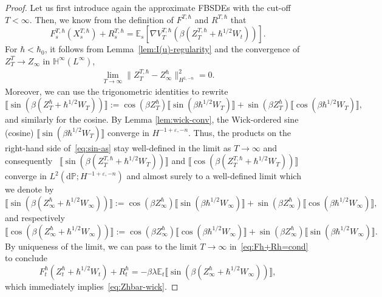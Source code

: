\documentclass[11pt, a4paper]{scrartcl}
\numberwithin{equation}{section}
\theoremstyle{plain}
\theoremstyle{remark}
\newcommand{\assign}{:=}
\newcommand{\mathd}{\mathrm{d}}
\begin{document}
\begin{proof}
  Let us first introduce again the approximate FBSDEs with the cut-off $T <
  \infty$. Then, we know from the definition of $F^{T, \hbar}$ and $R^{T,
  \hbar}$ that
  \begin{equation}
    F^{T, \hbar}_s (X^{T, \hbar}_s) + R^{T, \hbar}_s =\mathbb{E}_s [\nabla
    V^{T, \hbar}_T (\beta (Z_T^{T, \hbar} + \hbar^{1 / 2} W_t))] .
    \label{eq:Fh+Rh=cond}
  \end{equation}
  For $\hbar < \hbar_0$, it follows from Lemma~\ref{lem:I(u)-regularity} and
  the convergence of $Z^T_T \rightarrow Z_{\infty}$ in $\mathbb{H}^{\infty}
  (L^{\infty})$,
  \[ \begin{aligned}
       \lim_{T \rightarrow \infty} \| Z_T^{T, \hbar} - Z^{\hbar}_{\infty}
       \|_{H^{1, - n}}^2 = 0.
     \end{aligned} \]
  Moreover, we can use the trigonometric identities to rewrite
  \begin{equation}
    \llbracket \sin (\beta (Z^{\hbar}_T + \hbar^{1 / 2} W_T)) \rrbracket
    \assign \cos (\beta Z^{\hbar}_T) \llbracket \sin (\beta \hbar^{1 / 2} W_T)
    \rrbracket + \sin (\beta Z^{\hbar}_T) \llbracket \cos (\beta \hbar^{1 / 2}
    W_T) \rrbracket, \label{eq:sin-as}
  \end{equation}
  and similarly for the cosine. By Lemma \ref{lem:wick-conv}, the Wick-ordered
  sine (cosine) $\llbracket \sin (\beta \hbar^{1 / 2} W_T) \rrbracket$
  converge in $H^{- 1 + \varepsilon, - n}$. Thus, the products on the
  right-hand side of~\eqref{eq:sin-as} stay well-defined in the limit as $T
  \rightarrow \infty$ and consequently \ $\llbracket \sin (\beta (Z^{T,
  \hbar}_T + \hbar^{1 / 2} W_T)) \rrbracket$ and $\llbracket \cos (\beta
  (Z^{T, \hbar}_T + \hbar^{1 / 2} W_T)) \rrbracket$ converge in $L^2 (\mathd \mathbb{P}
  ; H^{- 1 + \varepsilon, - n})$ and almost surely to a well-defined limit
  which we denote by
  \begin{equation}
    \llbracket \sin (\beta (Z^{\hbar}_{\infty} + \hbar^{1 / 2} W_{\infty}))
    \rrbracket \assign \cos (\beta Z^{\hbar}_{\infty}) \llbracket \sin (\beta
    \hbar^{1 / 2} W_{\infty}) \rrbracket + \sin (\beta Z^{\hbar}_{\infty})
    \llbracket \cos (\beta \hbar^{1 / 2} W_{\infty}) \rrbracket,
    \label{eq:def-Vinfty}
  \end{equation}
  and respectively
  \[ \llbracket \cos (\beta (Z^{\hbar}_{\infty} + \hbar^{1 / 2} W_{\infty}))
     \rrbracket \assign \cos (\beta Z^{\hbar}_{\infty}) \llbracket \cos (\beta
     \hbar^{1 / 2} W_{\infty}) \rrbracket + \sin (\beta Z^{\hbar}_{\infty})
     \llbracket \sin (\beta \hbar^{1 / 2} W_{\infty}) \rrbracket . \]
  By uniqueness of the limit, we can pass to the limit $T \rightarrow \infty$
  in~\eqref{eq:Fh+Rh=cond} to conclude
  \[ F_t^{\hbar} (Z_t^{\hbar} + \hbar^{1 / 2} W_t) + R_t^{\hbar} = - \beta
     \lambda \mathbb{E}_t \llbracket \sin (\beta (Z^{\hbar}_{\infty} +
     \hbar^{1 / 2} W_{\infty})) \rrbracket, \]
  which immediately implies~\eqref{eq:Zhbar-wick}. 
\end{proof}
\end{document}
